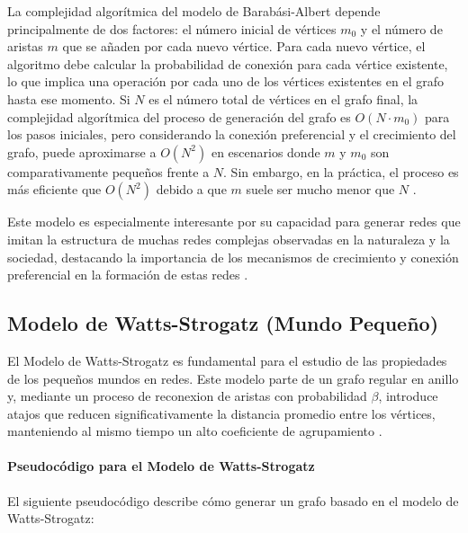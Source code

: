 La complejidad algorítmica del modelo de Barabási-Albert depende principalmente de dos factores: el número inicial de vértices $m_0$ y el número de aristas $m$ que se añaden por cada nuevo vértice. Para cada nuevo vértice, el algoritmo debe calcular la probabilidad de conexión para cada vértice existente, lo que implica una operación por cada uno de los vértices existentes en el grafo hasta ese momento. Si $N$ es el número total de vértices en el grafo final, la complejidad algorítmica del proceso de generación del grafo es $O(N \cdot m_0)$ para los pasos iniciales, pero considerando la conexión preferencial y el crecimiento del grafo, puede aproximarse a $O(N^2)$ en escenarios donde $m$ y $m_0$ son comparativamente pequeños frente a $N$. Sin embargo, en la práctica, el proceso es más eficiente que $O(N^2)$ debido a que $m$ suele ser mucho menor que $N$ .

Este modelo es especialmente interesante por su capacidad para generar redes que imitan la estructura de muchas redes complejas observadas en la naturaleza y la sociedad, destacando la importancia de los mecanismos de crecimiento y conexión preferencial en la formación de estas redes .
\subsection{Modelo de Watts-Strogatz (Mundo Pequeño)}

El Modelo de Watts-Strogatz es fundamental para el estudio de las propiedades de los pequeños mundos en redes. Este modelo parte de un grafo regular en anillo y, mediante un proceso de reconexion de aristas con probabilidad $\beta$, introduce atajos que reducen significativamente la distancia promedio entre los vértices, manteniendo al mismo tiempo un alto coeficiente de agrupamiento \citep{Watts1998} .

\paragraph{Pseudocódigo para el Modelo de Watts-Strogatz}

El siguiente pseudocódigo describe cómo generar un grafo basado en el modelo de Watts-Strogatz:

